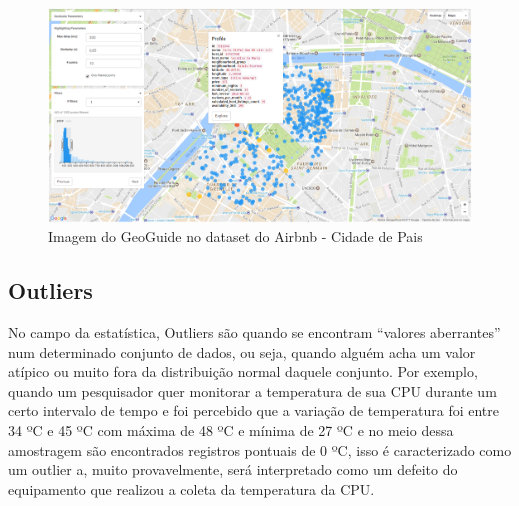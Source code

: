 \begin{figure}[t]
	\centering
	\includegraphics[width=\textwidth]{images/geoguide-example-airbnb}
	\caption{Imagem do GeoGuide no dataset do Airbnb - Cidade de Pais}
	\label{fig:geoguide-example-airbnb}
	\vspace{-10pt}
\end{figure}

\subsection{Outliers}



No campo da estatística, Outliers são quando se encontram ``valores aberrantes'' num determinado conjunto de dados, ou seja, quando alguém acha um valor atípico ou muito fora da distribuição normal daquele conjunto. Por exemplo, quando um pesquisador quer monitorar a temperatura de sua CPU durante um certo intervalo de tempo e foi percebido que a variação de temperatura foi entre 34 ºC e 45 ºC com máxima de 48 ºC e mínima de 27 ºC e no meio dessa amostragem são encontrados registros pontuais de 0 ºC, isso é caracterizado como um outlier a, muito provavelmente, será interpretado como um defeito do equipamento que realizou a coleta da temperatura da CPU.

